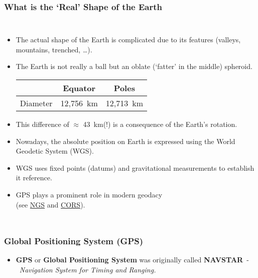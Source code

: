 \begin{frame}
\frametitle{What is the `Real' Shape of the Earth}
\begin{columns}
	\begin{itemize}
		\item The actual shape of the Earth is complicated due to its features (valleys, mountains, trenched, \ldots).
		\item The Earth is not really a ball but an oblate (`fatter' in the middle) spheroid.

		\begin{center}
			\begin{tabular}{ccc}
				& Equator & Poles\\
				\toprule
				Diameter & 12,756~km & 12,713~km \\
			\end{tabular}
		\end{center}

		\item This difference of $\approx$ 43~km(!) is a consequence of the Earth's rotation.
		\item Nowadays, the absolute position on Earth is expressed using the World Geodetic System (WGS).
		\item WGS uses fixed points (datums) and gravitational measurements to establish it reference.
		\item GPS plays a prominent role in modern geodacy\\ (see \href{http://www.ngs.noaa.gov}{NGS} and \href{http://geodesy.noaa.gov/CORS/}{CORS}).
	\end{itemize}
\end{columns}
\end{frame}

\begin{frame}
\frametitle{Global Positioning System (GPS)}
\bigskip
{}
\begin{itemize}
\item \textbf{GPS} or \textbf{Global Positioning System} was originally called \textbf{NAVSTAR}~-~\emph{Navigation System for Timing and Ranging.}
\end{itemize}
\end{frame}


